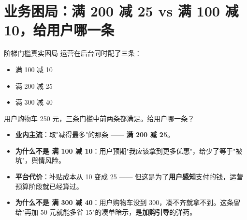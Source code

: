 \documentclass[aspectratio=169,11pt]{beamer}
\begin{document}
\section{业务困局：满 200 减 25 vs 满 100 减 10，给用户哪一条}

\begin{frame}[shrink]{阶梯门槛真实困局}
运营在后台同时配了三条：
\begin{itemize}
  \item 满 100 减 10
  \item 满 200 减 25
  \item 满 300 减 40
\end{itemize}
用户购物车 250 元，三条门槛中前两条都满足。给用户哪一条？
\vspace{2mm}
\begin{itemize}
  \item \textbf{业内主流}：取"减得最多"的那条 —— \textbf{满 200 减 25}。
  \item \textbf{为什么不是 满 100 减 10}：用户预期"我应该拿到更多优惠"，给少了等于"被坑"，舆情风险。
  \item \textbf{平台代价}：补贴成本从 10 变成 25 —— 但这是为了\textbf{用户感知}支付的钱，运营预算阶段就已经算过。
  \item \textbf{为什么不是 满 300 减 40}：用户购物车没到 300，凑不齐就拿不到。这条留给"再加 50 元就能多省 15"的凑单暗示，是\textbf{加购引导}的弹药。
\end{itemize}
\end{frame}
\end{document}
